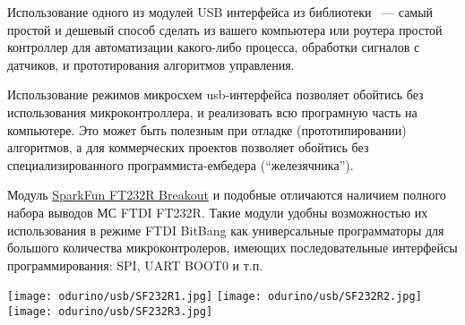 \secdown

Использование одного из модулей USB интерфейса из библиотеки \odurino\ --- самый
простой и дешевый способ сделать из вашего компьютера или роутера простой 
контроллер для автоматизации какого-либо процесса, обработки сигналов с
датчиков, и прототирования алгоритмов управления.

Использование  режимов микросхем usb-интерфейса
позволяет обойтись без использования микроконтроллера, и реализовать всю
програмную часть на компьютере. Это может быть полезным при отладке
(прототипировании) алгоритмов, а для коммерческих проектов позволяет обойтись
без специализированного программиста-ембедера (``железячника'').


Модуль \href{https://www.sparkfun.com/products/retired/718}{SparkFun FT232R
Breakout} и подобные отличаются наличием полного набора выводов МС FTDI FT232R.
Такие модули удобны возможностью их использования в режиме FTDI BitBang как
универсальные программаторы для большого количества микроконтролеров, имеющих
последовательные интерфейсы программирования: SPI, UART BOOT0 и т.п.

\texttt{[image: odurino/usb/SF232R1.jpg]}
\texttt{[image: odurino/usb/SF232R2.jpg]}
\texttt{[image: odurino/usb/SF232R3.jpg]}

\secup
